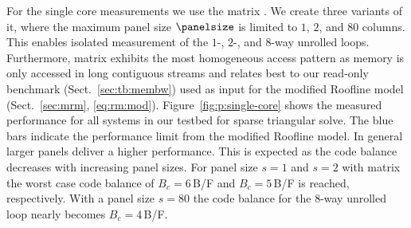 For the single core measurements we use the matrix .
We create three variants of it, where the maximum panel size $\panelsize$ is
limited to $1$, $2$, and $80$ columns.
This enables isolated measurement of the $1$-, $2$-, and $8$-way
unrolled loops.
Furthermore, matrix  exhibits the most homogeneous access pattern
as memory is only accessed in long contiguous streams and relates best to our
read-only benchmark (Sect.~\ref{sec:tb:membw}) used as input for the modified
Roofline model (Sect.~\ref{sec:mrm}, \eqref{eq:rm:mod}).
%
Figure~\ref{fig:p:single-core} shows the measured performance for all systems in
our testbed for sparse triangular solve.
The blue bars indicate the performance limit from the modified Roofline model.
%
In general larger panels deliver a higher performance.
This is expected as the code balance decreases with increasing panel sizes.
For panel size $s=1$ and $s=2$ with matrix  the worst case code balance
of $B_c=6$\,B/F and $B_c=5$\,B/F is reached, respectively. 
With a panel size $s=80$ the code balance for the $8$-way unrolled loop nearly
becomes $B_c=4$\,B/F.
  
